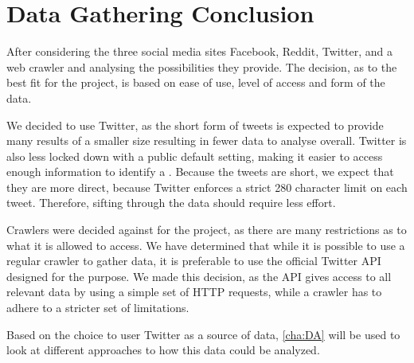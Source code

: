\section{Data Gathering Conclusion}\label{sec:social-media-conclusion}
After considering the three social media sites Facebook, Reddit, Twitter, and a
web crawler and analysing the possibilities they provide. The decision, as to
the best fit for the project, is based on ease of use, level of access and form
of the data.\nl

We decided to use Twitter, as the short form of tweets is expected to provide
many results of a smaller size resulting in fewer data to analyse overall.
Twitter is also less locked down with a public default setting, making it easier
to access enough information to identify a \fb. Because the tweets are short, we
expect that they are more direct, because Twitter enforces a strict 280
character limit on each tweet. Therefore, sifting through the data should
require less effort.\nl

Crawlers were decided against for the project, as there are many restrictions as
to what it is allowed to access. We have determined that while it is possible to
use a regular crawler to gather data, it is preferable to use the official
Twitter \ac{API} designed for the purpose. We made this decision, as the
\ac{API} gives access to all relevant data by using a simple set of \ac{HTTP}
requests, while a crawler has to adhere to a stricter set of limitations.\nl

Based on the choice to user Twitter as a source of data, \autoref{cha:DA} will
be used to look at different approaches to how this data could be analyzed.

